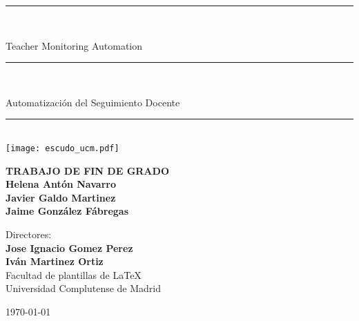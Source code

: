 \begin{titlepage}
	\thispagestyle{empty}

	\begin{center}

		\vspace{1cm}

		\vspace{0.65cm}
		\rule{2in}{0.5pt}\\
		\vspace{0.85cm}

		{\Large Teacher Monitoring Automation}\\

		\vspace{0.65cm}
		\rule{2in}{0.5pt}\\
		\vspace{0.85cm}

		{\Large Automatización del Seguimiento Docente}\\

		\vspace{0.65cm}
		\rule{2in}{0.5pt}\\



		\vfill
		\texttt{[image: escudo\_ucm.pdf]}
		\vfill

		

		\textbf{TRABAJO DE FIN DE GRADO}\\
		\vspace{0.7cm}
		\textbf{Helena Antón Navarro}\\
		\textbf{Javier Galdo Martinez}\\
		\textbf{Jaime González Fábregas}\\

		\vspace{1cm}

		Directores:\\
		\textbf{Jose Ignacio Gomez Perez}\\
		\textbf{Iván Martinez Ortiz}\\

		\vspace{1.8cm}
		Facultad de plantillas de \LaTeX\\
		Universidad Complutense de Madrid
		\vspace{0.5cm}
	   
		\today

		\vspace{0.2cm}

	\end{center}
\end{titlepage}